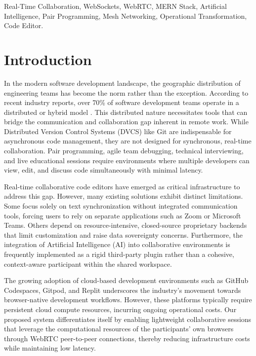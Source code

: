 \documentclass[conference]{IEEEtran}
\begin{document}
\begin{IEEEkeywords}
Real-Time Collaboration, WebSockets, WebRTC, MERN Stack, Artificial Intelligence, Pair Programming, Mesh Networking, Operational Transformation, Code Editor.
\end{IEEEkeywords}

\section{Introduction}
In the modern software development landscape, the geographic distribution of engineering teams has become the norm rather than the exception. According to recent industry reports, over 70\% of software development teams operate in a distributed or hybrid model \cite{b10}. This distributed nature necessitates tools that can bridge the communication and collaboration gap inherent in remote work. While Distributed Version Control Systems (DVCS) like Git are indispensable for asynchronous code management, they are not designed for synchronous, real-time collaboration. Pair programming, agile team debugging, technical interviewing, and live educational sessions require environments where multiple developers can view, edit, and discuss code simultaneously with minimal latency.

Real-time collaborative code editors have emerged as critical infrastructure to address this gap. However, many existing solutions exhibit distinct limitations. Some focus solely on text synchronization without integrated communication tools, forcing users to rely on separate applications such as Zoom or Microsoft Teams. Others depend on resource-intensive, closed-source proprietary backends that limit customization and raise data sovereignty concerns. Furthermore, the integration of Artificial Intelligence (AI) into collaborative environments is frequently implemented as a rigid third-party plugin rather than a cohesive, context-aware participant within the shared workspace.

The growing adoption of cloud-based development environments such as GitHub Codespaces, Gitpod, and Replit underscores the industry's movement towards browser-native development workflows. However, these platforms typically require persistent cloud compute resources, incurring ongoing operational costs. Our proposed system differentiates itself by enabling lightweight collaborative sessions that leverage the computational resources of the participants' own browsers through WebRTC peer-to-peer connections, thereby reducing infrastructure costs while maintaining low latency.
\end{document}
